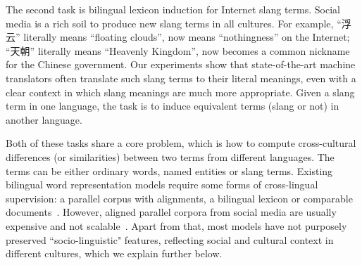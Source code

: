 The second task is bilingual lexicon induction for Internet slang terms. 
Social media is a rich soil to produce new slang 
terms in all cultures. 
For example, ``浮云'' literally means ``floating clouds'', 
now means ``nothingness'' on the Internet; 
``天朝'' literally means ``Heavenly Kingdom'', 
now becomes a common nickname for the Chinese government.
Our experiments show that state-of-the-art machine translators 
often translate such slang terms to their literal meanings, 
even with a clear context in which slang meanings are much more appropriate.
Given a slang term in one language, the task is to induce
equivalent terms (slang or not) in another language. 

Both of these tasks share a core problem, which is how to compute 
cross-cultural differences (or similarities) between two terms from 
different languages.
The terms can be either ordinary words, named entities or slang terms. 
Existing bilingual word representation models require 
some forms of cross-lingual supervision: 
a parallel corpus with alignments, a bilingual lexicon or 
comparable documents~\cite{upadhyay2016cross}.
However, aligned parallel corpora from social media are usually expensive 
and not scalable~\cite{Vicente2016TweetMTAP,ling2014crowdsourcing}. 
Apart from that, most models have not purposely preserved 
``socio-linguistic" features, reflecting social and cultural context in different cultures, which we
explain further below.

